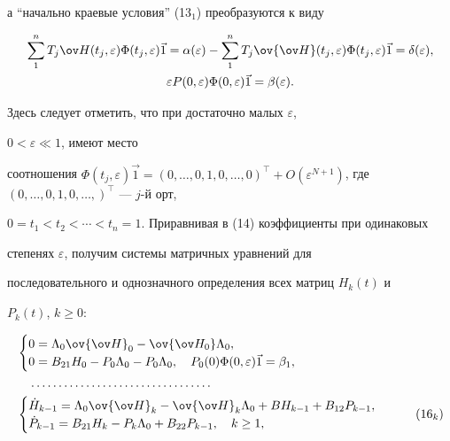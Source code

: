 а ``начально краевые условия'' (13$_1$) преобразуются к виду 


\begin{gather*} 


\sum^n_1T_j\ov H(t_j,\varepsilon)\Phi(t_j,\varepsilon)\Vec 1= 


\alpha(\varepsilon)-\sum^n_1T_j\ov{\ov H}(t_j,\varepsilon) 


\Phi(t_j,\varepsilon)\Vec 1=\delta(\varepsilon), \\ 


\varepsilon P(0,\varepsilon)\Phi(0,\varepsilon)\Vec 1=\beta(\varepsilon). 


\end{gather*} 


Здесь следует отметить, что при достаточно малых $\varepsilon$, 


$0<\varepsilon\ll1$, имеют место 


соотношения $\Phi(t_j,\varepsilon)\Vec 1=(0,\dotsc,0,1,0,\dotsc,0)^\top 


+O(\varepsilon^{N+1})$, где $(0,\dotsc,0,1,0,\dotsc,)^\top$ --- $j$-й орт, 


$0=t_1<t_2<\dotsb<t_n=1$. Приравнивая в (14) коэффициенты при одинаковых 


степенях $\varepsilon$, получим системы матричных уравнений для 


последовательного и однозначного определения всех матриц $H_k(t)$ и 


$P_k(t)$, $k\ge0$: 


\begin{align} 


& 


\begin{cases} 


0=\Lambda_0\ov{\ov H}_0-\ov{\ov H_0}\Lambda_0, \\ 


0=B_{21}H_0-P_0\Lambda_0-P_0\Lambda_0,\quad 


P_0(0)\Phi(0,\varepsilon)\Vec 1=\beta_1, 


\end{cases} 


\\ 


& \quad \dotsc\dotsc\dotsc\dotsc\dotsc\dotsc\dotsc\dotsc\dotsc\dotsc 


\dotsc \notag \\ 


& 


\begin{cases} 


\Dot H_{k-1}=\Lambda_0\ov{\ov H}_k-\ov{\ov H}_k\Lambda_0 


+B H_{k-1}+B_{12}P_{k-1}, \\ 


\Dot P_{k-1}=B_{21}H_k-P_k\Lambda_0 


+B_{22}P_{k-1},\quad k\ge1, 


\end{cases} 


\tag{16$_k$} 


\end{align} 


